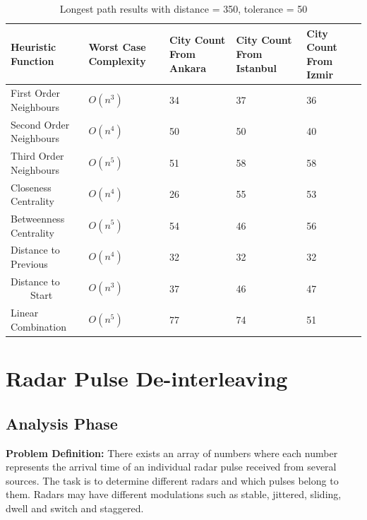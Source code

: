 \documentclass[12pt]{report}
\begin{document}
            \begin{table}[H]
                \centering
                \begin{tabular}{|P{3.5cm}|P{3cm}|P{3cm}|P{3cm}|P{3cm}|}
                \hline
                    \textbf{Heuristic Function} & \textbf{Worst Case Complexity} & \textbf{City Count From Ankara} & \textbf{City Count From Istanbul} & \textbf{City Count From Izmir} \\ \hline
                    First Order Neighbours & $O(n^3)$ & 34 & 37 & 36 \\ \hline
                    Second Order Neighbours & $O(n^4)$ & 50 & 50 & 40 \\ \hline
                    Third Order Neighbours & $O(n^5)$ & 51 & 58 & 58 \\ \hline
                    Closeness Centrality & $O(n^4)$ & 26 & 55 & 53 \\ \hline
                    Betweenness Centrality & $O(n^5)$ & 54 & 46 & 56 \\ \hline
                    Distance to Previous & $O(n^4)$ & 32 & 32 & 32 \\ \hline
                    Distance to \ \ \ \ Start & $O(n^3)$ & 37 & 46 & 47 \\ \hline
                    Linear Combination & $O(n^5)$ & 77 & 74 & 51 \\ \hline
                \end{tabular}
                \caption{Longest path results with distance = 350, tolerance = 50}
            \end{table}
            
    \section{Radar Pulse De-interleaving}
        \subsection{Analysis Phase}
            \textbf{Problem Definition:} There exists an array of numbers where each number represents the arrival time of an individual radar pulse received from several sources. The task is to
            determine different radars and which pulses belong to them. Radars may have different modulations such as stable, jittered, sliding, dwell and switch and staggered.
\end{document}

